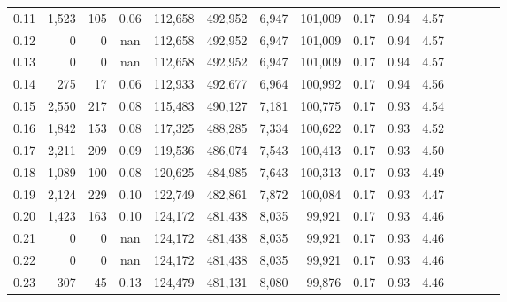 \begin{tabular}{rrrcrrrrrrrrrrr}
0.11 &   1,523 &     105 &                                       0.06 &  112,658 &  492,952 &    6,947 &  101,009 &  0.17 &  0.94 &                         4.57 \\
0.12 &       0 &       0 &                                        nan &  112,658 &  492,952 &    6,947 &  101,009 &  0.17 &  0.94 &                         4.57 \\
0.13 &       0 &       0 &                                        nan &  112,658 &  492,952 &    6,947 &  101,009 &  0.17 &  0.94 &                         4.57 \\
0.14 &     275 &      17 &                                       0.06 &  112,933 &  492,677 &    6,964 &  100,992 &  0.17 &  0.94 &                         4.56 \\
0.15 &   2,550 &     217 &                                       0.08 &  115,483 &  490,127 &    7,181 &  100,775 &  0.17 &  0.93 &                         4.54 \\
0.16 &   1,842 &     153 &                                       0.08 &  117,325 &  488,285 &    7,334 &  100,622 &  0.17 &  0.93 &                         4.52 \\
0.17 &   2,211 &     209 &                                       0.09 &  119,536 &  486,074 &    7,543 &  100,413 &  0.17 &  0.93 &                         4.50 \\
0.18 &   1,089 &     100 &                                       0.08 &  120,625 &  484,985 &    7,643 &  100,313 &  0.17 &  0.93 &                         4.49 \\
0.19 &   2,124 &     229 &                                       0.10 &  122,749 &  482,861 &    7,872 &  100,084 &  0.17 &  0.93 &                         4.47 \\
0.20 &   1,423 &     163 &                                       0.10 &  124,172 &  481,438 &    8,035 &   99,921 &  0.17 &  0.93 &                         4.46 \\
0.21 &       0 &       0 &                                        nan &  124,172 &  481,438 &    8,035 &   99,921 &  0.17 &  0.93 &                         4.46 \\
0.22 &       0 &       0 &                                        nan &  124,172 &  481,438 &    8,035 &   99,921 &  0.17 &  0.93 &                         4.46 \\
0.23 &     307 &      45 &                                       0.13 &  124,479 &  481,131 &    8,080 &   99,876 &  0.17 &  0.93 &                         4.46 \\

\end{tabular}
